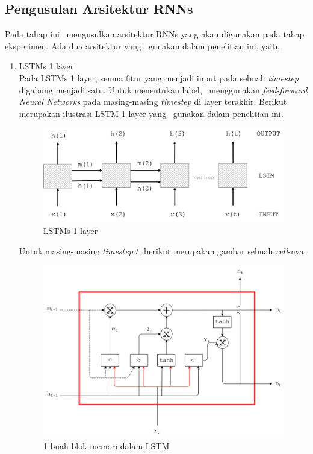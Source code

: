 \subsection{Pengusulan Arsitektur RNNs}
Pada tahap ini \saya~mengusulkan arsitektur RNNs yang akan digunakan pada tahap eksperimen. Ada dua arsitektur yang \saya~gunakan dalam penelitian ini, yaitu
\begin{enumerate}
	\item LSTMs 1 layer\\
	Pada LSTMs 1 layer, semua fitur yang menjadi input pada sebuah \textit{timestep} digabung menjadi satu. Untuk menentukan label, \saya~menggunakan \textit{feed-forward Neural Networks} pada masing-masing \textit{timestep} di layer terakhir. Berikut merupakan ilustrasi LSTM 1 layer yang \saya~gunakan dalam penelitian ini.
	
	\begin{figure}
		\centering
		\includegraphics[width=0.8\linewidth]{images/lstm1}
		\caption{LSTMs 1 layer}
		\label{fig:single_layer_rnn}
	\end{figure}
	Untuk masing-masing \textit{timestep} $ t $, berikut merupakan gambar sebuah \textit{cell}-nya.
	\begin{figure}
		\centering
		\includegraphics[width=0.85\linewidth]{images/lstm}
		\caption{1 buah blok memori dalam LSTM}
		\label{fig:lstm1cell}
	\end{figure}
	

\end{enumerate}
